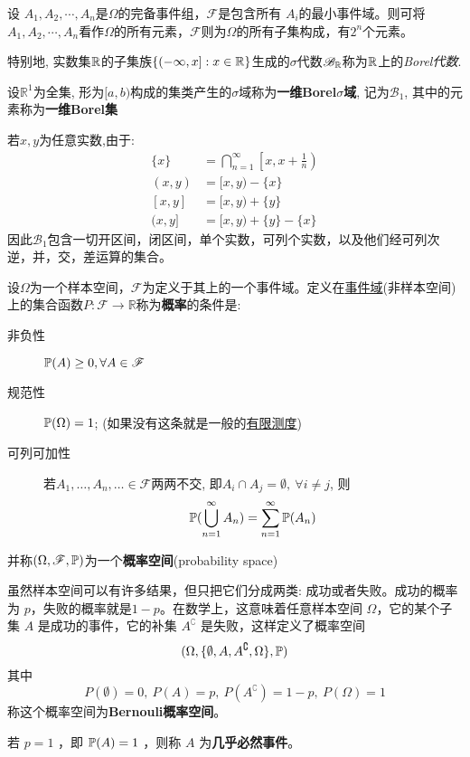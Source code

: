 \begin{example}
    设 $A_1, A_2, \cdots, A_n$是$\Omega$的完备事件组，$\mathcal{F}$是包含所有 $A_i$的最小事件域。则可将$A_1, A_2, \cdots, A_n$看作$\Omega$的所有元素，$\mathcal{F}$则为$\Omega$的所有子集构成，有$2^n$个元素。
\end{example}

特别地, 实数集$\R$的子集族$\{(-\infty,x] : x\in\R\}$生成的$\sigma$代数$\mathscr{B}_{\R}$称为$\R$上的\emph{Borel代数}.

\begin{definition}[Borel集]
    设$\mathbb{R}^1$为全集, 形为$[a,b)$构成的集类产生的$\sigma$域称为\textbf{一维Borel$\sigma$域}, 记为$\mathscr{B}_1$, 其中的元素称为\textbf{一维Borel集}
\end{definition}

若$x,y$为任意实数,由于:
\begin{align*}
    \{x\}  & =  \bigcap_{n=1}^{\infty}\left[x, x+\frac1{n}\right) \\
    (x, y) & =  [x, y)-\{x\}                                      \\
    [x, y] & =  [x, y)+\{y\}                                      \\
    (x, y] & =  [x, y)+\{y\}-\{x\}
\end{align*}
因此$\mathscr{B}_1$包含一切开区间，闭区间，单个实数，可列个实数，以及他们经可列次逆，并，交，差运算的集合。


\begin{definition}[概率空间]
    设$\Omega$为一个样本空间，$\mathscr{F}$为定义于其上的一个事件域。定义在\underline{事件域}(非样本空间)上的集合函数$P : \mathscr{F} \to \mathbb{R}$称为\textbf{概率}的条件是:
    \begin{description}
        \item[非负性]$\P(A)\ge 0 , \forall A \in \mathscr{F}$
        \item[规范性]$\P(\Omega) = 1$; (如果没有这条就是一般的\underline{有限测度})
        \item[可列可加性] 若$A_{1},\dots,A_{n},\ldots \in \mathscr{F}$两两不交, 即$A_{i}\cap A_{j} = \emptyset, \ \forall i\neq j$, 则
            \[ \P(\bigcup_{n=1}^{\infty}A_{n}) = \sum_{n=1}^{\infty}\P(A_{n}) \]
    \end{description}
    并称$(\Omega,\mathscr{F},\P)$为一个\textbf{概率空间}(probability space)
\end{definition}

\begin{example}[Bernouli概率空间]
    虽然样本空间可以有许多结果，但只把它们分成两类: 成功或者失败。成功的概率为 $p$，失败的概率就是$1 - p$。在数学上，这意味着任意样本空间 $\Omega$，它的某个子集 $A$ 是成功的事件，它的补集 $A^{\complement}$ 是失败，这样定义了概率空间
    \[ (\Omega, \{\emptyset, A, A^{\complement}, \Omega\},\P) \]
    其中
    \[ P(\emptyset) = 0,\ P(A)= p,\ P(A^{\complement})= 1 - p,\ P(\Omega)=1 \]
    称这个概率空间为\textbf{Bernouli概率空间}。

    若 $p=1$ ，即 $\P(A)=1$ ，则称 $A$ 为\textbf{几乎必然事件}。
\end{example}

